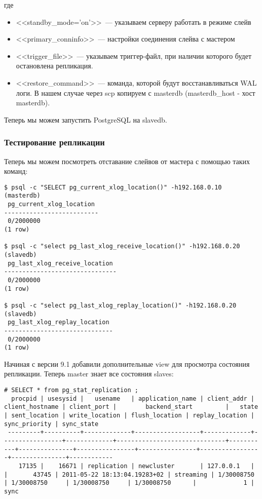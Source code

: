 где
\begin{itemize}
\item <<standby\_mode='on'>>~--- указываем серверу работать в режиме слейв
\item <<primary\_conninfo>>~--- настройки соединения слейва с мастером
\item <<trigger\_file>>~--- указываем триггер-файл, при наличии которого будет остановлена репликация.
\item <<restore\_command>>~--- команда, которой будут восстанавливаться WAL логи. В нашем случае через
scp копируем с masterdb (masterdb\_host - хост masterdb).
\end{itemize}

Теперь мы можем запустить PostgreSQL на slavedb.

\subsubsection{Тестирование репликации}
Теперь мы можем посмотреть отставание слейвов от мастера с помощью таких команд:
\begin{lstlisting}[label=lst:streaming15,caption=Тестирование репликации]
$ psql -c "SELECT pg_current_xlog_location()" -h192.168.0.10 (masterdb)
 pg_current_xlog_location
--------------------------
 0/2000000
(1 row)

$ psql -c "select pg_last_xlog_receive_location()" -h192.168.0.20 (slavedb)
 pg_last_xlog_receive_location
-------------------------------
 0/2000000
(1 row)

$ psql -c "select pg_last_xlog_replay_location()" -h192.168.0.20 (slavedb)
 pg_last_xlog_replay_location
------------------------------
 0/2000000
(1 row)
\end{lstlisting}

Начиная с версии 9.1 добавили дополнительные view для просмотра состояния репликации. Теперь master знает все состояния slaves:

\begin{lstlisting}[label=lst:streaming151,caption=Состояние слейвов]
# SELECT * from pg_stat_replication ;
  procpid | usesysid |   usename   | application_name | client_addr | client_hostname | client_port |        backend_start         |   state   | sent_location | write_location | flush_location | replay_location | sync_priority | sync_state
 ---------+----------+-------------+------------------+-------------+-----------------+-------------+------------------------------+-----------+---------------+----------------+----------------+-----------------+---------------+------------
    17135 |    16671 | replication | newcluster       | 127.0.0.1   |                 |       43745 | 2011-05-22 18:13:04.19283+02 | streaming | 1/30008750    | 1/30008750     | 1/30008750     | 1/30008750      |             1 | sync
\end{lstlisting}


